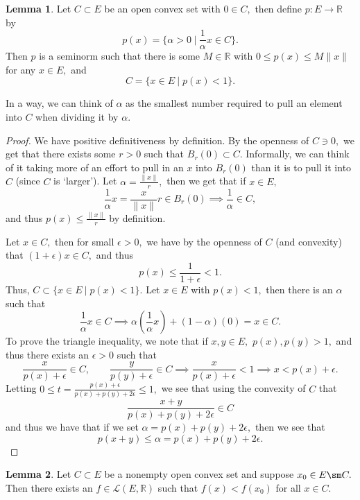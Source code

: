 \documentclass[10pt, oneside]{article}
\newcommand{\bbR}{\mathbb{R}}
\theoremstyle{definition}
\newtheorem{lem}{Lemma}
\begin{document}
\begin{lem}
    Let $C\subset E$ be an open convex set with $0\in C,$ then define $p: E\to \bbR$ by
    \[p(x) = \{\alpha > 0 \; | \: \frac{1}{\alpha}x \in C\}.\] Then $p$ is a seminorm such that there is some $M\in \bbR$ with $0\leq p(x) \leq M\|x\|$ for any $x\in E,$ and 
    \[C = \{x\in E \: | \; p(x) < 1\}.\]
\end{lem}
In a way, we can think of $\alpha$ as the smallest number required to pull an element into $C$ when dividing it by $\alpha.$ 
\begin{proof}
    We have positive definitiveness by definition. By the openness of $C \ni 0,$ we get that there exists some $r>0$ such that $B_r(0) \subset C.$ Informally, we can think of it taking more of an effort to pull in an $x$ into $B_r(0)$ than it is to pull it into $C$ (since $C$ is `larger'). Let $\alpha = \frac{\|x\|}{r},$ then we get that if $x\in E,$ 
    \[\frac{1}{\alpha}x = \frac{x}{\|x\|}r \in B_r(0) \implies \frac{1}{\alpha}\in C,\] and thus $p(x)\leq \frac{\|x\|}{r}$ by definition. 

    Let $x\in C,$ then for small $\epsilon>0,$ we have by the openness of $C$ (and convexity) that $(1  +\epsilon)x \in C,$ and thus 
    \[p(x)\leq \frac{1}{1+\epsilon}< 1.\] Thus, $C \subset \{x\in E \: | \; p(x) < 1\}.$ Let $x\in E$ with $p(x)< 1,$ then there is an $\alpha$ such that
    \[\frac{1}{\alpha}x \in C \implies \alpha(\frac{1}{\alpha} x) + (1-\alpha)(0) = x\in C.\] To prove the triangle inequality, we note that if $x,y\in E,$ $p(x), p(y) >1,$ and thus there exists an $\epsilon>0$ such that 
    \[\frac{x}{p(x) + \epsilon}\in C, \qquad \frac{y}{p(y) + \epsilon} \in C \implies \frac{x}{p(x)+ \epsilon}< 1 \implies x < p(x) + \epsilon.\] Letting $ 0 \leq t = \frac{p(x) + \epsilon}{p(x) + p(y) + 2\epsilon}\leq 1,$ we see that using the convexity of $C$ that 
    \[\frac{x + y}{p(x) + p(y) + 2\epsilon}\in C\] and thus we have that if we set $\alpha = p(x) + p(y) + 2\epsilon,$ then we see that 
    \[p(x + y) \leq \alpha = p(x) + p(y) + 2\epsilon.\] 
\end{proof}

\begin{lem}
    Let $C\subset E$ be a  nonempty open convex set and suppose $x_0 \in E\sm C.$ Then there exists an $f\in \mathcal{L}(E, \bbR)$ such that $f(x) < f(x_0)$ for all $x \in C.$ 
\end{lem}
\end{document}
